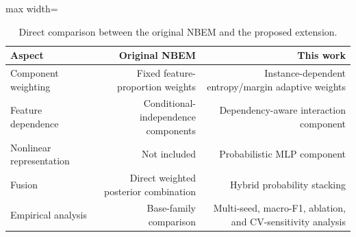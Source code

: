 \begin{table}[!htbp]
\centering
\scriptsize
\caption{Direct comparison between the original NBEM and the proposed extension.}
\label{tab:novelty}
\begin{adjustbox}{max width=\textwidth}
\begin{tabular}{lrr}
\toprule
Aspect & Original NBEM & This work \\
\midrule
Component weighting & Fixed feature-proportion weights & Instance-dependent entropy/margin adaptive weights \\
Feature dependence & Conditional-independence components & Dependency-aware interaction component \\
Nonlinear representation & Not included & Probabilistic MLP component \\
Fusion & Direct weighted posterior combination & Hybrid probability stacking \\
Empirical analysis & Base-family comparison & Multi-seed, macro-F1, ablation, and CV-sensitivity analysis \\
\bottomrule
\end{tabular}
\end{adjustbox}
\end{table}
